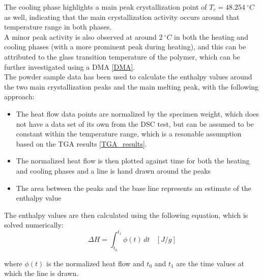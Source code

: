 \documentclass{article}
\begin{document}
        The cooling phase highlights a main peak crystallization point of $T_{c} =  48.254 \ ^{\circ}C$ as well, indicating 
        that the main crystallization activity occurs around that temperature range in both phases. \\ 

        A minor peak activity is also observed at around $2 \ ^{\circ}C$ in both the heating and cooling phases
        (with a more prominent peak during heating), and this can be attributed to the
        glass transition temperature of the polymer, which can be further investigated using a DMA \ref{DMA}. \\

        The powder sample data has been used to calculate the enthalpy values around the two main crystallization peaks and the main 
        melting peak, with the following approach: \\

        \begin{itemize}
            \item The heat flow data points are normalized by the specimen weight, which does not have a data set of its own from the DSC test, 
            but can be assumed to be constant within the temperature range, which is a resonable 
            assumption based on the TGA results \ref{TGA_results}.
            \item The normalized heat flow is then plotted against time for both the heating and cooling phases and 
            a line is hand drawn around the peaks
            \item The area between the peaks and the base line represents an estimate of the enthalpy value  
        \end{itemize}

        The enthalpy values are then calculated using the following equation, which is solved numerically: \\ 

        \begin{equation}
            \Delta H = \int_{t_0}^{t_1} \phi (t) \,dt \ \ \ \ [J/g]
            \label{eq:enthalpy}
        \end{equation}

        where $\phi (t)$ is the normalized heat flow and $t_0$ and $t_1$ are the time values at which the line is drawn. 

        \clearpage
\end{document}
